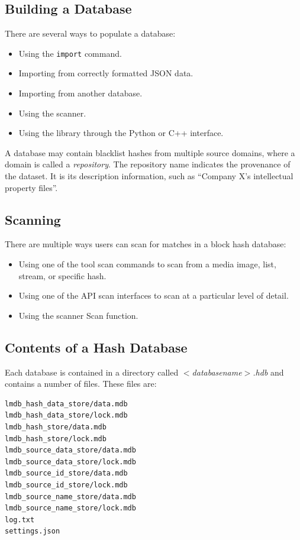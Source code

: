 \documentclass[11pt,fleqn]{article} %
\begin{document}
\subsection{Building a \hdb Database}
There are several ways to populate a database:

\begin{itemize}
\item Using the \hdb \verb+import+ command.
\item Importing from correctly formatted JSON data.
\item Importing from another database.
\item Using the \bulk \hdb scanner.
\item Using the \hdb library through the Python or C++ interface.
\end{itemize}

A database may contain blacklist hashes from multiple source domains,
where a domain is called a \textit{repository}.
The repository name indicates the provenance of the dataset.
It is its description information, such as ``Company X's intellectual property files''.\\

\subsection{Scanning}
There are multiple ways users can scan for matches in a block hash database:

\begin{itemize}
\item Using one of the \hdb tool scan commands to scan from a media image,
list, stream, or specific hash.
\item Using one of the \hdb API scan interfaces to scan at a particular
level of detail.
\item Using the \bulk \hdb scanner Scan function.
\end{itemize}

\subsection{Contents of a Hash Database}
\label{ContentsOfDB}
Each \hdb database is contained in a directory called \textit{$<$databasename$>$.hdb} and contains a number of files. These files are:

\begingroup
\footnotesize
\begin{Verbatim}[fontfamily=courier]
lmdb_hash_data_store/data.mdb
lmdb_hash_data_store/lock.mdb
lmdb_hash_store/data.mdb
lmdb_hash_store/lock.mdb
lmdb_source_data_store/data.mdb
lmdb_source_data_store/lock.mdb
lmdb_source_id_store/data.mdb
lmdb_source_id_store/lock.mdb
lmdb_source_name_store/data.mdb
lmdb_source_name_store/lock.mdb
log.txt
settings.json
\end{Verbatim}
\endgroup
\end{document}
